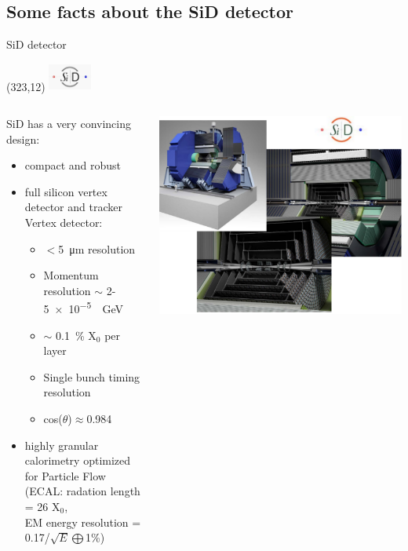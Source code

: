 \documentclass[xcolor={dvipsnames}]{beamer}
\newcommand{\sidlogo}{
  \setlength{\TPHorizModule}{1pt}
  \setlength{\TPVertModule}{1pt}
  \begin{textblock}{1}(323,12)
   \includegraphics[width=40pt,height=26pt]{figures/SiD.jpeg}
  \end{textblock}
  }
\begin{document}
\subsection{Some facts about the SiD detector}
\begin{frame}{SiD detector}
\sidlogo
 \begin{columns}
  \begin{column}{0.7\textwidth}
    SiD has a very convincing design:
 \begin{itemize}
  \item compact and robust
  \item full silicon vertex detector and tracker\\
  Vertex detector:
  \begin{itemize}
   \item $<$\SI{5}{\micro\metre} resolution
   \item Momentum resolution $\sim$ 2-\SI{5e-5}{\per\giga\electronvolt}
   \item $\sim$ \SI{0.1}{\percent} X$_0$ per layer
    \item Single bunch timing resolution
    \item cos($\theta$)$\approx$0.984
  \end{itemize}
  \item highly granular calorimetry optimized for Particle Flow (ECAL: radation length = 26 X$_0$, \\EM energy resolution = 0.17/$\sqrt{E}\bigoplus$1\%)
 \end{itemize}
  \end{column}
  \begin{column}{0.3\textwidth}
    \begin{flushright}
  \includegraphics[height=0.4\textheight]{figures/SiDpics.pdf}
 \end{flushright}
  \end{column}
 \end{columns}

\end{frame}
\end{document}
